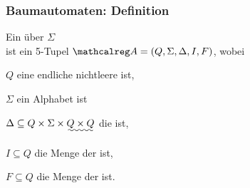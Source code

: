 \begin{frame}
  \frametitle{Baumautomaten: Definition}

  \begin{Definition}
    Ein  über $\Sigma$\\
    ist ein 5-$\!$Tupel
    $\Aut{A} = (Q, \Sigma, \Delta, I, F)$, wobei
    \begin{Itemize}
      \item
        $Q$ eine endliche nichtleere  ist,
      \item
        $\Sigma$ ein Alphabet ist
      \item
        $\Delta \subseteq Q \times \Sigma \times \uwave{Q \times Q}$ die  ist,
      \item
        $I \subseteq Q$ die Menge der  ist,
      \item
        $F \subseteq Q$ die Menge der  ist.
    \end{Itemize}
  \end{Definition}

  \par\bigskip

\end{frame}


